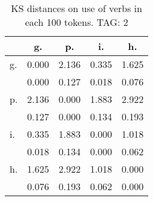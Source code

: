 \begin{table}[h!]
\begin{center}
\begin{tabular}{| l | c | c | c | c |}\hline
 & g. & p. & i. & h. \\\hline
g. & 0.000  & 2.136  & 0.335  & 1.625 \\\hline
 & 0.000  & 0.127  & 0.018  & 0.076 \\\hline
p. & 2.136  & 0.000  & 1.883  & 2.922 \\\hline
 & 0.127  & 0.000  & 0.134  & 0.193 \\\hline
i. & 0.335  & 1.883  & 0.000  & 1.018 \\\hline
 & 0.018  & 0.134  & 0.000  & 0.062 \\\hline
h. & 1.625  & 2.922  & 1.018  & 0.000 \\\hline
 & 0.076  & 0.193  & 0.062  & 0.000 \\\hline
\end{tabular}
\caption{KS distances on use of verbs in each 100 tokens. TAG: 2}
\end{center}
\end{table}